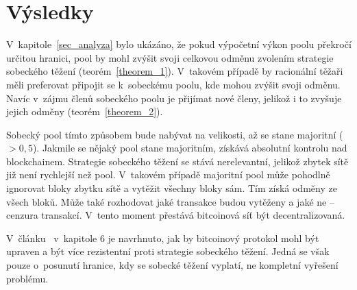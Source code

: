 
\section{Výsledky}
\label{sec_vysledky}

V~kapitole~\ref{sec_analyza} bylo ukázáno, že pokud výpočetní výkon poolu překročí určitou hranici, pool by mohl zvýšit svoji celkovou odměnu zvolením strategie sobeckého těžení (teorém~\ref{theorem_1}). V~takovém případě by racionální těžaři měli preferovat připojit se k~sobeckému poolu, kde mohou zvýšit svoji odměnu. Navíc v~zájmu členů sobeckého poolu je přijímat nové členy, jelikož i to zvyšuje jejich odměny (teorém~\ref{theorem_2}).

Sobecký pool tímto způsobem bude nabývat na velikosti, až se stane majoritní ($>0,5$). Jakmile se nějaký pool stane majoritním, získává absolutní kontrolu nad blockchainem. Strategie sobeckého těžení se stává nerelevantní, jelikož zbytek sítě již není rychlejší než pool. V~takovém případě majoritní pool může pohodlně ignorovat bloky zbytku sítě a vytěžit všechny bloky sám. Tím získá odměny ze všech bloků. Může také rozhodovat jaké transakce budou vytěženy a jaké ne -- cenzura transakcí. V~tento moment přestává bitcoinová síť být decentralizovaná.

V~článku~\cite{bib_paper} v~kapitole $6$ je navrhnuto, jak by bitcoinový protokol mohl být upraven a být více rezistentní proti strategie sobeckého těžení. Jedná se však pouze o~posunutí hranice, kdy se sobecké těžení vyplatí, ne kompletní vyřešení problému.

